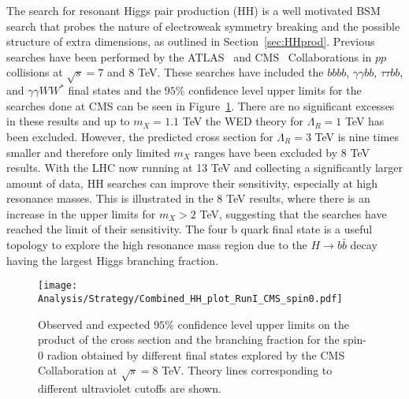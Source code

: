 The search for resonant Higgs pair production (HH) is a well motivated BSM search that probes the nature of electroweak symmetry breaking and the possible structure of extra dimensions, as outlined in Section~\ref{sec:HHprod}. Previous searches have been performed by the ATLAS~\cite{ATLAS_HH_GGbb, ATLAS_HH_bbbb, ATLAS_HH_Combined} and CMS~\cite{CMS_HH_bbbb, CMS_HH_tttt, CMS_HH_GGbb, CMS_HH_bbbb2} Collaborations in $pp$ collisions at $\sqrt{s}=7$ and 8 TeV. These searches have included the $bbbb$, $\gamma\gamma bb$, $\tau\tau bb$, and $\gamma\gamma WW^{\ast}$ final states and the $95\%$ confidence level upper limits for the searches done at CMS can be seen in Figure~\ref{fig:HH_8TeV}. There are no significant excesses in these results and up to $m_{X}=1.1$ TeV the WED theory for $\Lambda_R=1$ TeV has been excluded. However, the predicted cross section for $\Lambda_R=3$ TeV is nine times smaller and therefore only limited $m_{X}$ ranges have been excluded by 8 TeV results. With the LHC now running at 13 TeV and collecting a significantly larger amount of data, HH searches can improve their sensitivity, especially at high resonance masses. This is illustrated in the 8 TeV results, where there is an increase in the upper limits for $m_{X} > 2$ TeV, suggesting that the searches have reached the limit of their sensitivity. The four b quark final state is a useful topology to explore the high resonance mass region due to the $H\rightarrow b\bar{b}$ decay having the largest Higgs branching fraction.

\begin{figure}[h!]
  \begin{center}
    \texttt{[image: Analysis/Strategy/Combined\_HH\_plot\_RunI\_CMS\_spin0.pdf]}
  \end{center}
  \caption{Observed and expected $95\%$ confidence level upper limits on the product of the cross section and the branching fraction for the spin-0 radion obtained by different final states explored by the CMS Collaboration at $\sqrt{s}=8$ TeV. Theory lines corresponding to different ultraviolet cutoffs are shown.}
  \label{fig:HH_8TeV}
\end{figure}



